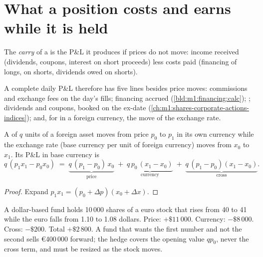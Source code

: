 \section{What a position costs and earns while it is held}

\begin{definition}[Carry]\label{def:m1:pnl-and-positions:carry}
The \emph{carry} of a  is the P\&L it produces if prices
do not move: income received (dividends, coupons, interest on short proceeds)
less costs paid (financing of longs,  on shorts, dividends owed on
shorts).
\end{definition}

A complete daily P\&L therefore has five lines besides price moves:
commissions and exchange fees on the day's fills; financing accrued
(\cref{bld:m1:financing:calc}); ; dividends and coupons, booked on
the ex-date (\cref{ch:m1:shares-corporate-actions-indices}); and, for
 in a foreign currency, the move of the exchange rate.

\begin{proposition}\label{prop:m1:pnl-and-positions:fx}
A  of $q$ units of a foreign asset moves from price $p_0$ to $p_1$
in its own currency while the exchange rate (base currency per unit of
foreign currency) moves from $x_0$ to $x_1$. Its P\&L in base currency is
\[
q\,(p_1x_1 - p_0x_0) \;=\; \underbrace{q\,(p_1-p_0)\,x_0}_{\text{price}}
 \;+\; \underbrace{q\,p_0\,(x_1-x_0)}_{\text{currency}}
 \;+\; \underbrace{q\,(p_1-p_0)(x_1-x_0)}_{\text{cross}} .
\]
\end{proposition}
\begin{proof}
Expand $p_1x_1 = (p_0 + \Delta p)(x_0 + \Delta x)$.
\end{proof}

\begin{example}\label{ex:m1:pnl-and-positions:fx}
A dollar-based fund holds 10\,000 shares of a euro stock that rises from 40
to 41 while the euro falls from 1.10 to 1.08 dollars. Price: $+\$11\,000$.
Currency: $-\$8\,000$. Cross: $-\$200$. Total $+\$2\,800$. A fund that wants
the first number and not the second sells \euro 400\,000 forward; the hedge
covers the opening value $qp_0$, never the cross term, and must be resized as
the stock moves.
\end{example}

